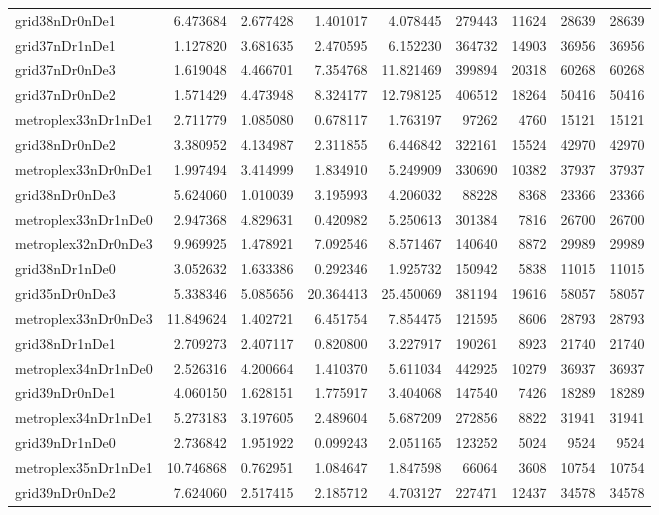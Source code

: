 \begin{longtable}{|l|r|r|r|r|r|r|r|r|}
grid38nDr0nDe1 & 6.473684 & 2.677428 & 1.401017 & 4.078445 & 279443 & 11624 & 28639 & 28639 \\
grid37nDr1nDe1 & 1.127820 & 3.681635 & 2.470595 & 6.152230 & 364732 & 14903 & 36956 & 36956 \\
grid37nDr0nDe3 & 1.619048 & 4.466701 & 7.354768 & 11.821469 & 399894 & 20318 & 60268 & 60268 \\
grid37nDr0nDe2 & 1.571429 & 4.473948 & 8.324177 & 12.798125 & 406512 & 18264 & 50416 & 50416 \\
metroplex33nDr1nDe1 & 2.711779 & 1.085080 & 0.678117 & 1.763197 & 97262 & 4760 & 15121 & 15121 \\
grid38nDr0nDe2 & 3.380952 & 4.134987 & 2.311855 & 6.446842 & 322161 & 15524 & 42970 & 42970 \\
metroplex33nDr0nDe1 & 1.997494 & 3.414999 & 1.834910 & 5.249909 & 330690 & 10382 & 37937 & 37937 \\
grid38nDr0nDe3 & 5.624060 & 1.010039 & 3.195993 & 4.206032 & 88228 & 8368 & 23366 & 23366 \\
metroplex33nDr1nDe0 & 2.947368 & 4.829631 & 0.420982 & 5.250613 & 301384 & 7816 & 26700 & 26700 \\
metroplex32nDr0nDe3 & 9.969925 & 1.478921 & 7.092546 & 8.571467 & 140640 & 8872 & 29989 & 29989 \\
grid38nDr1nDe0 & 3.052632 & 1.633386 & 0.292346 & 1.925732 & 150942 & 5838 & 11015 & 11015 \\
grid35nDr0nDe3 & 5.338346 & 5.085656 & 20.364413 & 25.450069 & 381194 & 19616 & 58057 & 58057 \\
metroplex33nDr0nDe3 & 11.849624 & 1.402721 & 6.451754 & 7.854475 & 121595 & 8606 & 28793 & 28793 \\
grid38nDr1nDe1 & 2.709273 & 2.407117 & 0.820800 & 3.227917 & 190261 & 8923 & 21740 & 21740 \\
metroplex34nDr1nDe0 & 2.526316 & 4.200664 & 1.410370 & 5.611034 & 442925 & 10279 & 36937 & 36937 \\
grid39nDr0nDe1 & 4.060150 & 1.628151 & 1.775917 & 3.404068 & 147540 & 7426 & 18289 & 18289 \\
metroplex34nDr1nDe1 & 5.273183 & 3.197605 & 2.489604 & 5.687209 & 272856 & 8822 & 31941 & 31941 \\
grid39nDr1nDe0 & 2.736842 & 1.951922 & 0.099243 & 2.051165 & 123252 & 5024 & 9524 & 9524 \\
metroplex35nDr1nDe1 & 10.746868 & 0.762951 & 1.084647 & 1.847598 & 66064 & 3608 & 10754 & 10754 \\
grid39nDr0nDe2 & 7.624060 & 2.517415 & 2.185712 & 4.703127 & 227471 & 12437 & 34578 & 34578 \\

\end{longtable}
